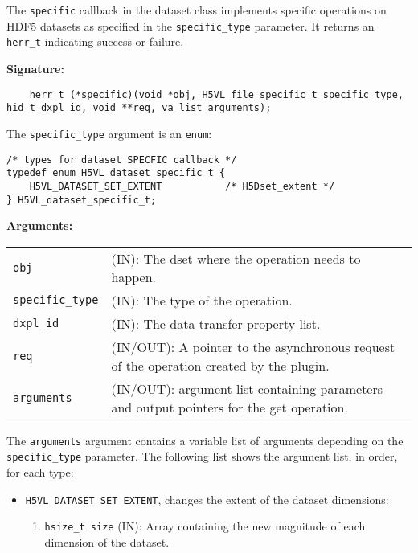 The \texttt{specific} callback in the dataset class implements specific operations on HDF5 datasets as specified in the \texttt{specific\_type} parameter. It returns an \texttt{herr\_t} indicating success or failure.\bigskip

\begin{mdframed}[style=bgbox]
\textbf{Signature:}
\begin{lstlisting}
    herr_t (*specific)(void *obj, H5VL_file_specific_t specific_type, hid_t dxpl_id, void **req, va_list arguments);
\end{lstlisting}

The \texttt{specific\_type} argument is an \texttt{enum}:
\begin{lstlisting}
/* types for dataset SPECFIC callback */
typedef enum H5VL_dataset_specific_t {
    H5VL_DATASET_SET_EXTENT           /* H5Dset_extent */
} H5VL_dataset_specific_t;
\end{lstlisting}

\textbf{Arguments:}\\
\begin{tabular}{l p{13.5cm}}
  \texttt{obj} & (IN): The dset  where the operation needs
  to happen.\\
  \texttt{specific\_type} & (IN): The type of the operation.\\
  \texttt{dxpl\_id} & (IN): The data transfer property list.\\
  \texttt{req} & (IN/OUT): A pointer to the asynchronous request of the
  operation created by the plugin.\\
  \texttt{arguments} & (IN/OUT): argument list containing parameters and
  output pointers for the get operation. \\
\end{tabular}
\end{mdframed}

The \texttt{arguments} argument contains a variable list of arguments
depending on the \texttt{specific\_type} parameter. The following list shows
the argument list, in order, for each type:

\begin{itemize}
\item \texttt{H5VL\_DATASET\_SET\_EXTENT}, changes the extent of the dataset dimensions:
  \begin{enumerate}
  \item \texttt{hsize\_t size} (IN): Array containing the new magnitude of each dimension of the dataset. 
  \end{enumerate}
\end{itemize}

